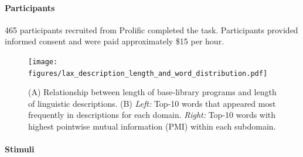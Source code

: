 \documentclass[10pt,letterpaper]{article}
\begin{document}
\paragraph{Participants}
465 participants recruited from Prolific completed the task. 
Participants provided informed consent and were paid approximately \$15 per hour. %

\begin{figure}[ht!]
  \begin{center}
  \texttt{[image: figures/lax\_description\_length\_and\_word\_distribution.pdf]}
  \caption{(A) Relationship between length of base-library programs and length of linguistic descriptions. (B) \textit{Left:} Top-10 words that appeared most frequently in descriptions for each domain. \textit{Right:} Top-10 words with highest pointwise mutual information (PMI) within each subdomain.}
  \label{fig:words}
  \end{center}
\end{figure}

\paragraph{Stimuli} 


\end{document}
